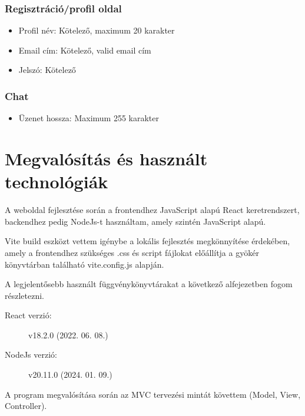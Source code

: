 \subsubsection{Regisztráció/profil oldal}

\begin{itemize}
	\item Profil név: Kötelező, maximum 20 karakter
	\item Email cím: Kötelező, valid email cím
	\item Jelszó: Kötelező
\end{itemize}

\subsubsection{Chat}

\begin{itemize}
	\item Üzenet hossza: Maximum 255 karakter
\end{itemize}

\pagebreak

\section{Megvalósítás és használt technológiák}

A weboldal fejlesztése során a frontendhez JavaScript alapú React \cite{react} keretrendszert, backendhez pedig NodeJs-t \cite{nodejs} használtam, amely szintén JavaScript alapú.

\bigskip

Vite build eszközt vettem igénybe a lokális fejlesztés megkönnyítése érdekében, amely a frontendhez szükséges .css és script fájlokat előállítja a gyökér könyvtárban található vite.config.js alapján.

\bigskip

A legjelentősebb használt függvénykönyvtárakat a következő alfejezetben fogom részletezni.

\bigskip

\begin{description}
	\item[React verzió:] v18.2.0 (2022. 06. 08.)
	\item[NodeJs verzió:] v20.11.0 (2024. 01. 09.)
\end{description}

\bigskip

A program megvalósítása során az MVC tervezési mintát követtem (Model, View, Controller).


